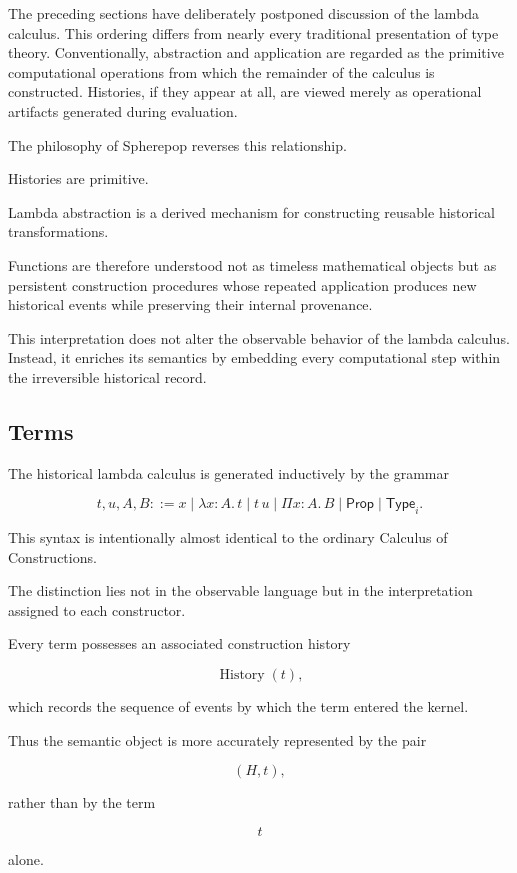 \documentclass[12pt,oneside]{article}
\theoremstyle{definition}
\theoremstyle{remark}
\newcommand{\Type}{\mathsf{Type}}
\newcommand{\Prop}{\mathsf{Prop}}
\DeclareMathOperator{\History}{History}
\begin{document}
The preceding sections have deliberately postponed discussion of the lambda
calculus. This ordering differs from nearly every traditional presentation of
type theory. Conventionally, abstraction and application are regarded as the
primitive computational operations from which the remainder of the calculus is
constructed. Histories, if they appear at all, are viewed merely as operational
artifacts generated during evaluation.

The philosophy of Spherepop reverses this relationship.

Histories are primitive.

Lambda abstraction is a derived mechanism for constructing reusable historical
transformations.

Functions are therefore understood not as timeless mathematical objects but as
persistent construction procedures whose repeated application produces new
historical events while preserving their internal provenance.

This interpretation does not alter the observable behavior of the lambda
calculus. Instead, it enriches its semantics by embedding every computational
step within the irreversible historical record.

\subsection{Terms}

The historical lambda calculus is generated inductively by the grammar

\[
t,u,A,B
::=
x
\mid
\lambda x:A.\,t
\mid
t\,u
\mid
\Pi x:A.\,B
\mid
\Prop
\mid
\Type_i.
\]

This syntax is intentionally almost identical to the ordinary Calculus of
Constructions.

The distinction lies not in the observable language but in the interpretation
assigned to each constructor.

Every term possesses an associated construction history

\[
\History(t),
\]

which records the sequence of events by which the term entered the kernel.

Thus the semantic object is more accurately represented by the pair

\[
(H,t),
\]

rather than by the term

\[
t
\]

alone.
\end{document}
